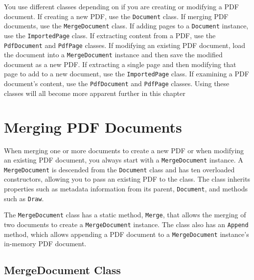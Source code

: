 \documentclass[american]{tufte-book}
\numberwithin{equation}{section}
\numberwithin{figure}{section}
\begin{document}
{{You use different classes depending on if you are creating or modifying
a PDF document. If creating a new PDF, use the \texttt{Document} class.
If merging PDF documents, use the \texttt{MergeDocument} class. If
adding pages to a \texttt{Document} instance, use the \texttt{ImportedPage}
class. If extracting content from a PDF, use the \texttt{PdfDocument}
and \texttt{PdfPage} classes. If modifying an existing PDF document,
load the document into a \texttt{MergeDocument} instance and then
save the modified document as a new PDF.
If extracting a single page and then modifying that page to add to
a new document, use the \texttt{ImportedPage} class. If examining
a PDF document's content, use the \texttt{PdfDocument} and \texttt{PdfPage}
classes. Using these classes will all become more apparent further
in this chapter
\section{Merging PDF Documents}

When merging one or more documents to create a new PDF or when modifying
an existing PDF document, you always start with a \texttt{MergeDocument}
instance. A \texttt{MergeDocument} is descended from the \texttt{Document}
class and has ten overloaded constructors, allowing you to pass an
existing PDF to the class. The class inherits properties such as metadata
information from its parent, \texttt{Document}, and methods such as
\texttt{Draw}.

The \texttt{MergeDocument} class has a static method, \texttt{Merge},
that allows the merging of two documents to create a \texttt{MergeDocument}
instance. The class also has an \texttt{Append} method, which allows
appending a PDF document to a \texttt{MergeDocument} instance's in-memory
PDF document. 

\subsection{MergeDocument Class}

}}
\end{document}
